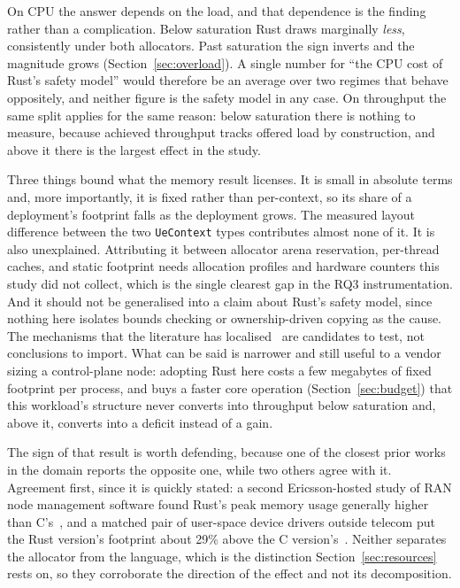 \documentclass[english,twoside,openright,a4paper,censored,csm,software-track-2020]{HYthesisML}
\begin{document}
On CPU the answer depends on the load, and that dependence is the finding rather than a
complication. Below saturation Rust draws marginally \emph{less}, consistently under both
allocators. Past saturation the sign inverts and the magnitude grows
(Section~\ref{sec:overload}). A single number for ``the CPU cost of
Rust's safety model'' would therefore be an average over two regimes that behave oppositely, and
neither figure is the safety model in any case. On throughput the same split applies for the same
reason: below saturation there is nothing to measure, because achieved throughput tracks offered
load by construction, and above it there is the largest effect in the study.

Three things bound what the memory result licenses. It is small in absolute terms and, more
importantly, it is fixed rather than per-context, so its share of a deployment's footprint
falls as the deployment grows. The measured layout difference between the two
\texttt{UeContext} types contributes almost none of it. It is also unexplained. Attributing it
between allocator arena reservation, per-thread caches, and static footprint needs allocation
profiles and hardware counters this study did not collect, which is the single clearest gap in
the RQ3 instrumentation. And it should not be generalised into a claim about Rust's safety
model, since nothing here isolates bounds checking or ownership-driven copying as the cause.
The mechanisms that the literature has localised~\cite{zhang2022runtime,harris2023morello}
are candidates to test, not conclusions to import. What can be said is narrower and still
useful to a vendor sizing a control-plane node: adopting Rust here costs a few megabytes of
fixed footprint per process, and buys a faster core operation
(Section~\ref{sec:budget}) that this workload's structure never converts into throughput below
saturation and, above it, converts into a deficit instead of a gain.

The sign of that result is worth defending, because one of the closest prior works in the domain
reports the opposite one, while two others agree with it. Agreement first, since it is quickly
stated: a second Ericsson-hosted study of RAN node management software found Rust's peak memory
usage generally higher than C's~\cite{olsson2023ranmgmt}, and a matched pair of user-space device
drivers outside telecom put the Rust version's footprint about 29\% above the C
version's~\cite{sundvisson2026drivers}. Neither separates the allocator from the language, which
is the distinction Section~\ref{sec:resources} rests on, so they corroborate the direction of the
effect and not its decomposition.
\end{document}
